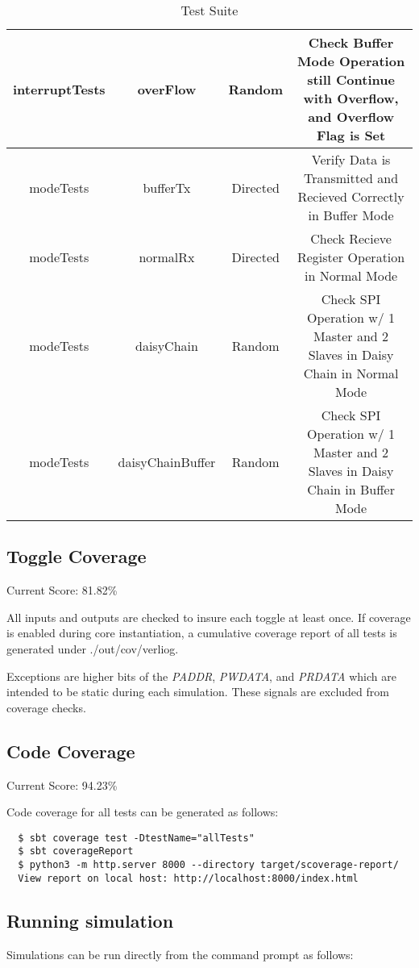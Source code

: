 \begin{table}[h]
{\begin{tabular}{|c|c|c|c|}
      interruptTests & overFlow & Random & Check Buffer Mode Operation still Continue with Overflow, and Overflow Flag is Set \\ \hline
      modeTests & bufferTx & Directed & Verify Data is Transmitted and Recieved Correctly in Buffer Mode \\ \hline
      modeTests & normalRx & Directed & Check Recieve Register Operation in Normal Mode \\ \hline
      modeTests & daisyChain & Random & Check SPI Operation w/ 1 Master and 2 Slaves in Daisy Chain in Normal Mode \\ \hline
      modeTests & daisyChainBuffer & Random & Check SPI Operation w/ 1 Master and 2 Slaves in Daisy Chain in Buffer Mode \\ \hline
    \end{tabular}
  }
  \caption{Test Suite}
\end{table}

\subsection{Toggle Coverage}
Current Score: 81.82\%

All inputs and outputs are checked to insure each toggle at least once. If coverage is enabled
during core instantiation, a cumulative coverage report of all tests is generated under ./out/cov/verliog.

Exceptions are higher bits of the \emph{PADDR}, \emph{PWDATA}, and \emph{PRDATA}
which are intended to be static during each simulation. These signals are
excluded from coverage checks.

\subsection{Code Coverage}
Current Score: 94.23\%

Code coverage for all tests can be generated as follows:
\begin{verbatim}
  $ sbt coverage test -DtestName="allTests"
  $ sbt coverageReport
  $ python3 -m http.server 8000 --directory target/scoverage-report/
  View report on local host: http://localhost:8000/index.html
\end{verbatim}

\subsection{Running simulation}

Simulations can be run directly from the command prompt as follows:

